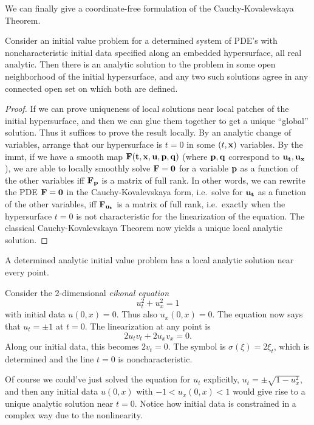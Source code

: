 We can finally give a coordinate-free formulation of the Cauchy-Kovalevskaya Theorem.

\begin{thm}
    Consider an initial value problem for a determined system of PDE's with noncharacteristic initial data specified along an embedded hypersurface, all real analytic. Then there is an analytic solution to the problem in some open neighborhood of the initial hypersurface, and any two such solutions agree in any connected open set on which both are defined.
\end{thm}
\begin{proof}
    If we can prove uniqueness of local solutions near local patches of the initial hypersurface, and then we can glue them together to get a unique ``global'' solution. Thus it suffices to prove the result locally. By an analytic change of variables, arrange that our hypersurface  is $t=0$ in some $(t,\bf{x})$ variables. By the \gls{immt}, if we have a smooth map $\bf{F}(t,\bf{x},\bf{u},\bf{p},\bf{q})$ (where $\bf{p},\bf{q}$ correspond to $\bf{u}_t,\bf{u}_{\bf x}$), we are able to locally smoothly solve $\bf{F}=0$ for a variable $\bf{p}$ as a function of the other variables iff $\bf{F}_{\bf{p}}$ is a matrix of full rank. In other words, we can rewrite the PDE $\bf{F}=0$ in the Cauchy-Kovalevskaya form, i.e.\ solve for $\bf{u}_t$ as a function of the other variables, iff $\bf{F}_{\bf{u}_t}$ is a matrix of full rank, i.e.\ exactly when the hypersurface $t=0$ is not characteristic for the linearization of the equation. The classical Cauchy-Kovalevskaya Theorem now yields a unique local analytic solution.
\end{proof}
\begin{cor}
    A determined analytic initial value problem has a local analytic solution near every point.
\end{cor}

\begin{example}
    Consider the $2$-dimensional \emph{eikonal equation} 
    \[u_t^2+u_x^2=1\]
    with initial data $u(0,x)=0$. Thus also $u_x(0,x)=0$. The equation now says that $u_t=\pm 1$ at $t=0$. The linearization at any point is 
    \[2u_t v_t+2u_x v_x=0.\]
    Along our initial data, this becomes $2v_t=0$. The symbol is $\sigma(\xi)=2\xi_t$, which is determined and the line $t=0$ is noncharacteristic. 

    Of course we could've just solved the equation for $u_t$ explicitly, $u_t=\pm \sqrt{1-u_x^2}$, and then any initial data $u(0,x)$ with $-1<u_x(0,x)<1$ would give rise to a unique analytic solution near $t=0$. Notice how initial data is constrained in a complex way due to the nonlinearity.
\end{example}

